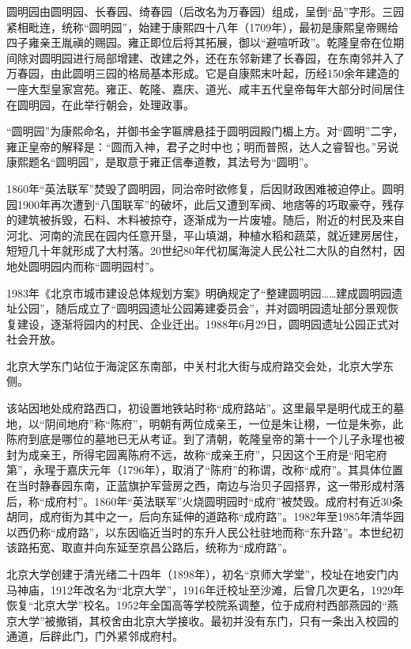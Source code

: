 圆明园由圆明园、长春园、绮春园（后改名为万春园）组成，呈倒“品”字形。三园紧相毗连，统称“圆明园”，始建于康熙四十八年（1709年），最初是康熙皇帝赐给四子雍亲王胤禛的赐园。雍正即位后将其拓展，御以“避喧听政”。乾隆皇帝在位期间除对圆明园进行局部增建、改建之外，还在东邻新建了长春园，在东南邻并入了万春园，由此圆明三园的格局基本形成。它是自康熙末叶起，历经150余年建造的一座大型皇家宫苑。雍正、乾隆、嘉庆、道光、咸丰五代皇帝每年大部分时间居住在圆明园，在此举行朝会，处理政事。

“圆明园”为康熙命名，并御书金字匾牌悬挂于圆明园殿门楣上方。对“圆明”二字，雍正皇帝的解释是：“圆而入神，君子之时中也；明而普照，达人之睿智也。”另说康熙题名“圆明园”，是取意于雍正信奉道教，其法号为“圆明”。

1860年“英法联军”焚毁了圆明园，同治帝时欲修复，后因财政困难被迫停止。圆明园1900年再次遭到“八国联军”的破坏，此后又遭到军阀、地痞等的巧取豪夺，残存的建筑被拆毁，石料、木料被掠夺，逐渐成为一片废墟。随后，附近的村民及来自河北、河南的流民在园内任意开垦，平山填湖，种植水稻和蔬菜，就近建房居住，短短几十年就形成了大村落。20世纪80年代初属海淀人民公社二大队的自然村，因地处圆明园内而称“圆明园村”。

1983年《北京市城市建设总体规划方案》明确规定了“整建圆明园……建成圆明园遗址公园”，随后成立了“圆明园遗址公园筹建委员会”，并对圆明园遗址部分景观恢复建设，逐渐将园内的村民、企业迁出。1988年6月29日，圆明园遗址公园正式对社会开放。

北京大学东门站位于海淀区东南部，中关村北大街与成府路交会处，北京大学东侧。

该站因地处成府路西口，初设置地铁站时称“成府路站”。这里最早是明代成王的墓地，以“阴间地府”称“陈府”，明朝有两位成亲王，一位是朱让栩，一位是朱弥，此陈府到底是哪位的墓地已无从考证。到了清朝，乾隆皇帝的第十一个儿子永瑆也被封为成亲王，所得宅园离陈府不远，故称“成亲王府”，只因这个王府是“阳宅府第”，永瑆于嘉庆元年（1796年），取消了“陈府”的称谓，改称“成府”。其具体位置在当时静春园东南，正蓝旗护军营房之西，南边与治贝子园搭界，这一带形成村落后，称“成府村”。1860年“英法联军”火烧圆明园时“成府”被焚毁。成府村有近30条胡同，成府街为其中之一，后向东延伸的道路称“成府路”。1982年至1985年清华园以西仍称“成府路”，以东因临近当时的东升人民公社驻地而称“东升路”。本世纪初该路拓宽、取直并向东延至京昌公路后，统称为“成府路”。

北京大学创建于清光绪二十四年（1898年），初名“京师大学堂”，校址在地安门内马神庙，1912年改名为“北京大学”，1916年迁校址至沙滩，后曾几次更名，1929年恢复“北京大学”校名。1952年全国高等学校院系调整，位于成府村西部燕园的“燕京大学”被撤销，其校舍由北京大学接收。最初并没有东门，只有一条出入校园的通道，后辟此门，门外紧邻成府村。

